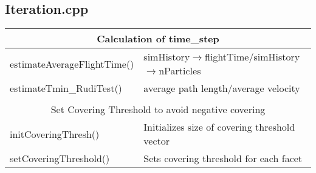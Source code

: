 \subsection{Iteration.cpp}
\begin{center}
\begin{tabular}{|l|l|}
\hline
\multicolumn{2}{|c|}{\rule{0pt}{3ex}Calculation of time\_step}\\
\hline
\rule{0pt}{3ex} estimateAverageFlightTime()& simHistory$\rightarrow$flightTime/simHistory$\rightarrow$nParticles\\
\rule{0pt}{3ex} estimateTmin\_RudiTest()&average path length/average velocity\\
\hline
\multicolumn{2}{l}{}\\[1ex]
\hline
\multicolumn{2}{|c|}{\rule{0pt}{3ex}Set Covering Threshold to avoid negative covering}\\
\hline
\rule{0pt}{3ex} initCoveringThresh()& Initializes size of covering threshold vector\\
\rule{0pt}{3ex} setCoveringThreshold()& Sets covering threshold for each facet\\
\hline
\end{tabular}
\end{center}

